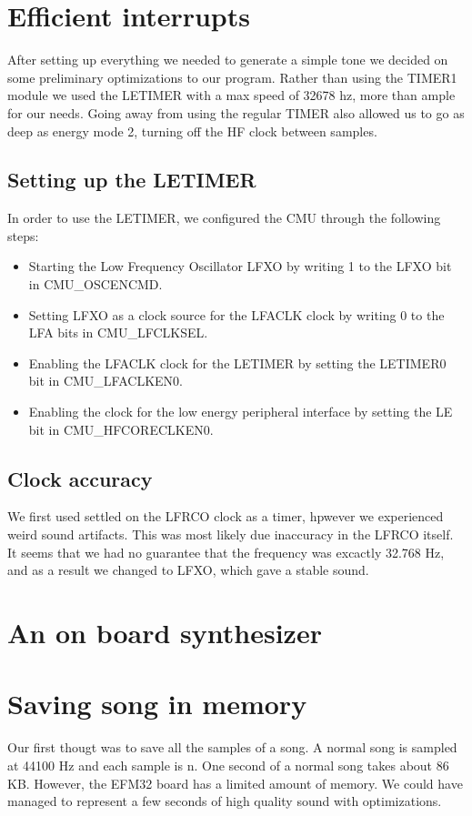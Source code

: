 \section{Efficient interrupts}
After setting up everything we needed to generate a simple tone we decided on some preliminary optimizations to our program. Rather than using the TIMER1 module we used the LETIMER with a max speed of 32678 hz, more than ample for our needs. Going away from using the regular TIMER also allowed us to go as deep as energy mode 2, turning off the HF clock between samples.

\subsection{Setting up the LETIMER}
In order to use the LETIMER, we configured the CMU through the following steps:
\begin{itemize}
  \item Starting the Low Frequency Oscillator LFXO by writing 1 to the LFXO bit in CMU\_OSCENCMD.
  \item Setting LFXO as a clock source for the LFACLK clock by writing 0 to the LFA bits in CMU\_LFCLKSEL.
  \item Enabling the LFACLK clock for the LETIMER by setting the LETIMER0 bit in CMU\_LFACLKEN0.
  \item Enabling the clock for the low energy peripheral interface by setting the LE bit in CMU\_HFCORECLKEN0.
\end{itemize}

\subsection{Clock accuracy}
We first used settled on the LFRCO clock as a timer, hpwever we experienced weird sound artifacts. This was most likely due inaccuracy in the LFRCO itself. It seems that we had no guarantee that the frequency was excactly 32.768 Hz, and as a result we changed to LFXO, which gave a stable sound.


\section{An on board synthesizer}


\section{Saving song in memory}
Our first thougt was to save all the samples of a song. A normal song is sampled at 44100 Hz and each sample is n. One second of a normal song takes about 86 KB. However, the EFM32 board has a limited amount of memory. We could have managed to represent a few seconds of high quality sound with optimizations. 

